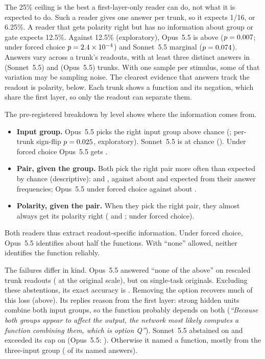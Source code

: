 \documentclass[10pt]{article}
\newcommand{\Sonnet}{Sonnet~5.5}
\newcommand{\Opus}{Opus~5.5}
\begin{document}
The 25\% ceiling is the best a first-layer-only reader can do, not what it is expected to do. Such a reader gives one answer per trunk, so it expects 1/16, or 6.25\%. A reader that gets polarity right but has no information about group or gate expects 12.5\%. Against 12.5\% (exploratory), \Opus{} is above ($p=0.007$; under forced choice $p=2.4 \times 10^{-4}$) and \Sonnet{} marginal ($p=0.074$). Answers vary across a trunk's readouts, with at least three distinct answers in \nSonTrDistinct{} (\Sonnet) and \nOpusTrDistinct{} (\Opus) trunks. With one sample per stimulus, some of that variation may be sampling noise. The clearest evidence that answers track the readout is polarity, below. Each trunk shows a function and its negation, which share the first layer, so only the readout can separate them.

The pre-registered breakdown by level shows where the information comes from.
\begin{itemize}
\item \textbf{Input group.} \Opus{} picks the right input group above chance (\nOpusTrGrp; per-trunk sign-flip $p=0.025$, exploratory). \Sonnet{} is at chance (\nSonTrGrp). Under forced choice \Opus{} gets \nRFiveTrGrp.
\item \textbf{Pair, given the group.} Both pick the right pair more often than expected by chance (descriptive): \nSonTrPair{} and \nOpusTrPair, against about \nSonTrPairExp{} and \nOpusTrPairExp{} expected from their answer frequencies; \Opus{} under forced choice \nRFiveTrPair{} against about \nRFiveTrPairExp.
\item \textbf{Polarity, given the pair.} When they pick the right pair, they almost always get its polarity right (\nSonTrPolPair{} and \nOpusTrPolPair; \nRFiveTrPolPair{} under forced choice).
\end{itemize}
Both readers thus extract readout-specific information. Under forced choice, \Opus{} identifies about half the functions. With ``none'' allowed, neither identifies the function reliably.

The failures differ in kind. \Opus{} answered ``none of the above'' on \nOpusTrNoneR{} rescaled trunk readouts (\nOpusTrOldNone{} at the original scale), but on \nOpusSingleNone{} single-task originals. Excluding these abstentions, its exact accuracy is \nOpusTrExactAnswered. Removing the option recovers much of this loss (above). Its replies reason from the first layer: strong hidden units combine both input groups, so the function probably depends on both (\emph{``Because both groups appear to affect the output, the network most likely computes a function combining them, which is option Q''}). \Sonnet{} abstained on \nSonTrNoneR{} and exceeded its cap on \nSonTrTrunc{} (\Opus: \nOpusTrTrunc). Otherwise it named a function, mostly from the three-input group (\nSonTrThreeGroup{} of its named answers).
\end{document}
